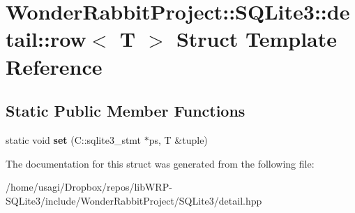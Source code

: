 \hypertarget{structWonderRabbitProject_1_1SQLite3_1_1detail_1_1row}{\section{Wonder\-Rabbit\-Project\-:\-:S\-Q\-Lite3\-:\-:detail\-:\-:row$<$ T $>$ Struct Template Reference}
\label{structWonderRabbitProject_1_1SQLite3_1_1detail_1_1row}
}
\subsection*{Static Public Member Functions}
\begin{DoxyCompactItemize}
\item 
\hypertarget{structWonderRabbitProject_1_1SQLite3_1_1detail_1_1row_a007fa3cbe1bcdb9c326ae34c1681346e}{static void {\bfseries set} (C\-::sqlite3\-\_\-stmt $\ast$ps, T \&tuple)}\label{structWonderRabbitProject_1_1SQLite3_1_1detail_1_1row_a007fa3cbe1bcdb9c326ae34c1681346e}

\end{DoxyCompactItemize}


The documentation for this struct was generated from the following file\-:\begin{DoxyCompactItemize}
\item 
/home/usagi/\-Dropbox/repos/lib\-W\-R\-P-\/\-S\-Q\-Lite3/include/\-Wonder\-Rabbit\-Project/\-S\-Q\-Lite3/detail.\-hpp\end{DoxyCompactItemize}
